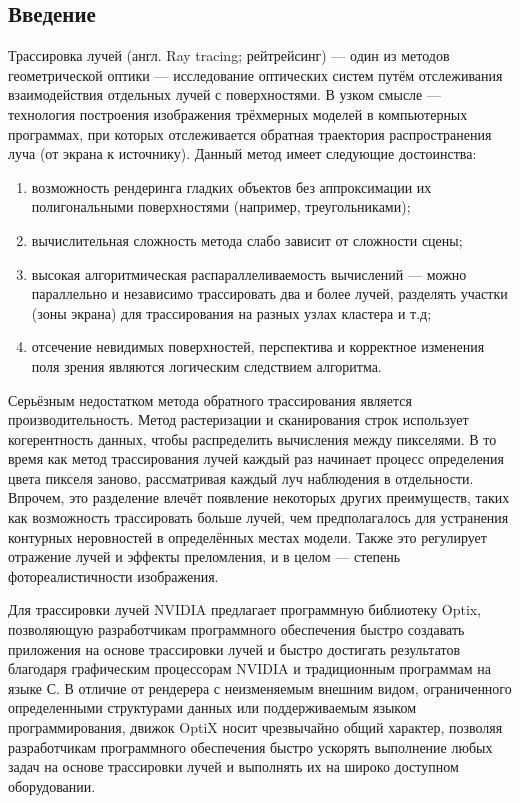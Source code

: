 \begin{center}
\section*{Введение}
\end{center}

Трассировка лучей (англ. Ray tracing; рейтрейсинг) --- один из методов геометрической оптики --- исследование оптических систем путём отслеживания взаимодействия отдельных лучей с поверхностями. В узком смысле --- технология построения изображения трёхмерных моделей в компьютерных программах, при которых отслеживается обратная траектория распространения луча (от экрана к источнику).
Данный метод имеет следующие достоинства:
\begin{enumerate}
\item возможность рендеринга гладких объектов без аппроксимации их полигональными поверхностями (например, треугольниками);
\item вычислительная сложность метода слабо зависит от сложности сцены;
\item высокая алгоритмическая распараллеливаемость вычислений — можно параллельно и независимо трассировать два и более лучей, разделять участки (зоны экрана) для трассирования на разных узлах кластера и т.д;
\item отсечение невидимых поверхностей, перспектива и корректное изменения поля зрения являются логическим следствием алгоритма.
\end{enumerate}
Серьёзным недостатком метода обратного трассирования является производительность. 
Метод растеризации и сканирования строк использует когерентность данных, чтобы распределить вычисления между пикселями. 
В то время как метод трассирования лучей каждый раз начинает процесс определения цвета пикселя заново, рассматривая каждый луч наблюдения в отдельности. 
Впрочем, это разделение влечёт появление некоторых других преимуществ, таких как возможность трассировать больше лучей, чем предполагалось для устранения контурных неровностей в определённых местах модели. 
Также это регулирует отражение лучей и эффекты преломления, и в целом — степень фотореалистичности изображения.\cite{Wiki}

Для трассировки лучей NVIDIA предлагает программную библиотеку Optix, позволяющую разработчикам программного обеспечения быстро создавать приложения на основе трассировки лучей и быстро достигать результатов благодаря графическим процессорам NVIDIA и традиционным программам на языке С. 
В отличие от рендерера с неизменяемым внешним видом, ограниченного определенными структурами данных или поддерживаемым языком программирования, движок OptiX носит чрезвычайно общий характер, позволяя разработчикам программного обеспечения быстро ускорять выполнение любых задач на основе трассировки лучей и выполнять их на широко доступном оборудовании.

